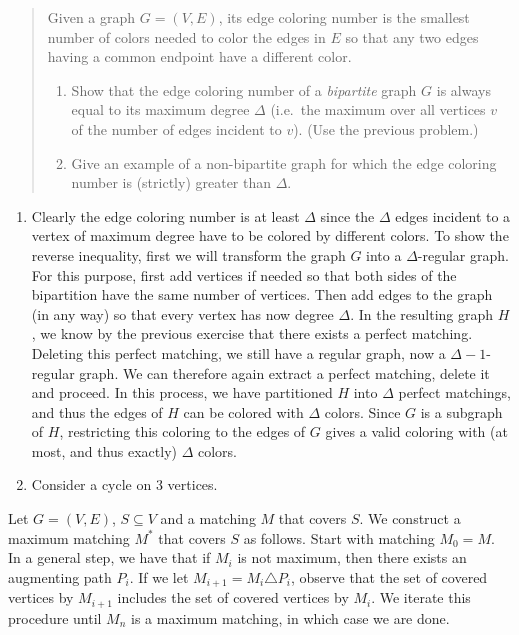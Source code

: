 \documentclass[12pt]{article}
\begin{document}
\begin{enumerate}
\item[1-17]
\begin{quote}
\item
Given a graph $G=(V,E)$, its edge coloring number is the smallest
number of colors needed to color the edges in $E$ so that any two
edges having a common endpoint have a different color. 
\begin{enumerate}
\item
Show that the edge coloring number of a {\it bipartite} graph $G$ is
always equal to its maximum degree $\Delta$ (i.e.~the maximum over all
vertices $v$ of the number of edges incident to $v$). (Use the
previous problem.) 
\item
Give an example of a non-bipartite graph for which the edge coloring
number is (strictly) greater than $\Delta$. 
\end{enumerate}
\end{quote}

\begin{enumerate}
\item
Clearly the edge coloring number is at least $\Delta$ since the
$\Delta$ edges incident to a vertex of maximum degree have to be
colored by different colors. To show the reverse inequality, first we
will transform  the graph $G$ into a $\Delta$-regular graph. For this
purpose, first add vertices if needed so that both sides of the
bipartition have the same number of vertices. Then add edges to the
graph (in any way) so that every vertex has now degree $\Delta$. In
the resulting graph $H$, we know by the previous exercise that there
exists a perfect matching. Deleting this perfect matching, we still
have a regular graph, now a $\Delta-1$-regular graph. We can therefore
again extract a perfect matching, delete it and proceed. In this
process, we have partitioned $H$ into $\Delta$ perfect matchings, and
thus the edges of $H$ can be colored with $\Delta$ colors. Since $G$
is a subgraph of $H$, restricting this coloring to the edges of $G$
gives a valid coloring with (at most, and thus exactly) $\Delta$ colors. 

\item
Consider a cycle on 3 vertices. 
\end{enumerate}

\item[2-2] %
Let $G = (V,E)$, $S\subseteq V$ and a matching $M$ that covers $S$.
We construct a maximum matching $M^*$ that covers $S$ as follows.
Start with matching $M_0 = M$. In a general step, we have that if
$M_i$ is not maximum, then there exists an augmenting path $P_i$.
If we let $M_{i+1} = M_i \triangle P_i$, observe that the set
of covered vertices by $M_{i+1}$ includes the set of covered vertices
by $M_i$. We iterate this procedure until $M_n$ is a maximum matching, in which case we are done.


\end{enumerate}
\end{document}
